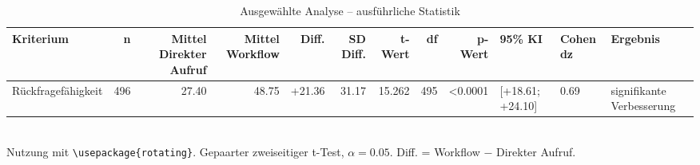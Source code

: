 \begin{table}
\centering
\caption{Ausgewählte Analyse -- ausführliche Statistik}
\begin{tabular}{lrrrrrrrrlll}
\toprule
Kriterium & n & Mittel Direkter Aufruf & Mittel Workflow & Diff. & SD Diff. & t-Wert & df & p-Wert & 95\% KI & Cohen dz & Ergebnis \\
\midrule
Rückfragefähigkeit & 496 & 27.40 & 48.75 & +21.36 & 31.17 & 15.262 & 495 & <0.0001 & [+18.61; +24.10] & 0.69 & signifikante Verbesserung \\
\bottomrule
\end{tabular}
\\[2mm]
\footnotesize Nutzung mit \texttt{\textbackslash usepackage\{rotating\}}. Gepaarter zweiseitiger t-Test, $\alpha=0.05$. Diff. = Workflow $-$ Direkter Aufruf.
\end{table}
